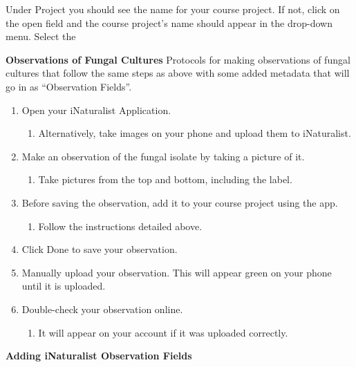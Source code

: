 \documentclass[
  letterpaper,
  DIV=11,
  numbers=noendperiod]{scrreprt}
\providecommand{\tightlist}{%
  \setlength{\itemsep}{0pt}\setlength{\parskip}{0pt}}
\begin{document}
Under Project you should see the name for your course project. If not,
click on the open field and the course project's name should appear in
the drop-down menu. Select the

\textbf{Observations of Fungal Cultures} Protocols for making
observations of fungal cultures that follow the same steps as above with
some added metadata that will go in as ``Observation Fields''.

\begin{enumerate}
\def\labelenumi{\arabic{enumi}.}
\setcounter{enumi}{8}
\tightlist
\item
  Open your iNaturalist Application.

  \begin{enumerate}
  \def\labelenumii{\alph{enumii}.}
  \tightlist
  \item
    Alternatively, take images on your phone and upload them to
    iNaturalist.
  \end{enumerate}
\item
  Make an observation of the fungal isolate by taking a picture of it.

  \begin{enumerate}
  \def\labelenumii{\alph{enumii}.}
  \tightlist
  \item
    Take pictures from the top and bottom, including the label.
  \end{enumerate}
\item
  Before saving the observation, add it to your course project using the
  app.

  \begin{enumerate}
  \def\labelenumii{\alph{enumii}.}
  \tightlist
  \item
    Follow the instructions detailed above.
  \end{enumerate}
\item
  Click Done to save your observation.
\item
  Manually upload your observation. This will appear green on your phone
  until it is uploaded.
\item
  Double-check your observation online.

  \begin{enumerate}
  \def\labelenumii{\alph{enumii}.}
  \tightlist
  \item
    It will appear on your account if it was uploaded correctly.
  \end{enumerate}
\end{enumerate}

\textbf{Adding iNaturalist Observation Fields}
\end{document}
